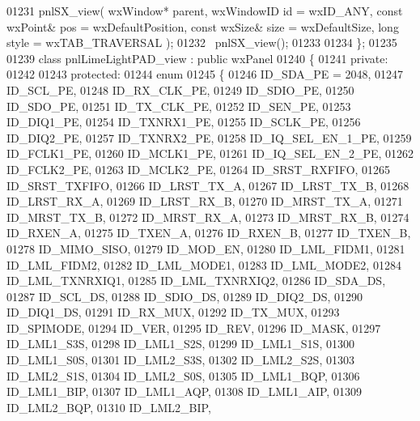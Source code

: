 \begin{DoxyCode}
01231         pnlSX_view( wxWindow* parent, wxWindowID \textcolor{keywordtype}{id} = wxID\_ANY, \textcolor{keyword}{const} wxPoint& pos = wxDefaultPosition, \textcolor{keyword}{
      const} wxSize& size = wxDefaultSize, \textcolor{keywordtype}{long} style = wxTAB\_TRAVERSAL ); 
01232         ~pnlSX_view();
01233     
01234 \};
01235 
01239 \textcolor{keyword}{class }pnlLimeLightPAD_view : \textcolor{keyword}{public} wxPanel 
01240 \{
01241     \textcolor{keyword}{private}:
01242     
01243     \textcolor{keyword}{protected}:
01244         \textcolor{keyword}{enum}
01245         \{
01246             ID\_SDA\_PE = 2048,
01247             ID_SCL_PE,
01248             ID_RX_CLK_PE,
01249             ID_SDIO_PE,
01250             ID_SDO_PE,
01251             ID_TX_CLK_PE,
01252             ID_SEN_PE,
01253             ID_DIQ1_PE,
01254             ID_TXNRX1_PE,
01255             ID_SCLK_PE,
01256             ID_DIQ2_PE,
01257             ID_TXNRX2_PE,
01258             ID_IQ_SEL_EN_1_PE,
01259             ID_FCLK1_PE,
01260             ID_MCLK1_PE,
01261             ID_IQ_SEL_EN_2_PE,
01262             ID_FCLK2_PE,
01263             ID_MCLK2_PE,
01264             ID_SRST_RXFIFO,
01265             ID_SRST_TXFIFO,
01266             ID_LRST_TX_A,
01267             ID_LRST_TX_B,
01268             ID_LRST_RX_A,
01269             ID_LRST_RX_B,
01270             ID_MRST_TX_A,
01271             ID_MRST_TX_B,
01272             ID_MRST_RX_A,
01273             ID_MRST_RX_B,
01274             ID_RXEN_A,
01275             ID_TXEN_A,
01276             ID_RXEN_B,
01277             ID_TXEN_B,
01278             ID_MIMO_SISO,
01279             ID_MOD_EN,
01280             ID_LML_FIDM1,
01281             ID_LML_FIDM2,
01282             ID_LML_MODE1,
01283             ID_LML_MODE2,
01284             ID_LML_TXNRXIQ1,
01285             ID_LML_TXNRXIQ2,
01286             ID_SDA_DS,
01287             ID_SCL_DS,
01288             ID_SDIO_DS,
01289             ID_DIQ2_DS,
01290             ID_DIQ1_DS,
01291             ID_RX_MUX,
01292             ID_TX_MUX,
01293             ID_SPIMODE,
01294             ID_VER,
01295             ID_REV,
01296             ID_MASK,
01297             ID_LML1_S3S,
01298             ID_LML1_S2S,
01299             ID_LML1_S1S,
01300             ID_LML1_S0S,
01301             ID_LML2_S3S,
01302             ID_LML2_S2S,
01303             ID_LML2_S1S,
01304             ID_LML2_S0S,
01305             ID_LML1_BQP,
01306             ID_LML1_BIP,
01307             ID_LML1_AQP,
01308             ID_LML1_AIP,
01309             ID_LML2_BQP,
01310             ID_LML2_BIP,

\end{DoxyCode}
